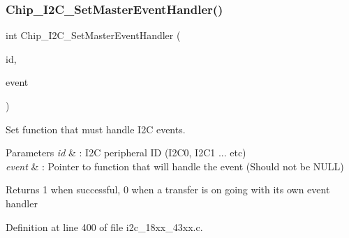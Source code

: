\subsubsection{\texorpdfstring{Chip\+\_\+\+I2\+C\+\_\+\+Set\+Master\+Event\+Handler()}{Chip\_I2C\_SetMasterEventHandler()}}
{\footnotesize\ttfamily int Chip\+\_\+\+I2\+C\+\_\+\+Set\+Master\+Event\+Handler (\begin{DoxyParamCaption}\item[{\hyperlink{group___i2_c__18_x_x__43_x_x_ga957556a4d900506cd4cba8427afd81e6}{I2\+C\+\_\+\+I\+D\+\_\+T}}]{id,  }\item[{\hyperlink{group___i2_c__18_x_x__43_x_x_gaef152f4dc1487d90573810007489082e}{I2\+C\+\_\+\+E\+V\+E\+N\+T\+H\+A\+N\+D\+L\+E\+R\+\_\+T}}]{event }\end{DoxyParamCaption})}



Set function that must handle I2C events. 


\begin{DoxyParams}{Parameters}
{\em id} & \+: I2C peripheral ID (I2\+C0, I2\+C1 ... etc) \\
\hline
{\em event} & \+: Pointer to function that will handle the event (Should not be N\+U\+LL) \\
\hline
\end{DoxyParams}
\begin{DoxyReturn}{Returns}
1 when successful, 0 when a transfer is on going with its own event handler 
\end{DoxyReturn}


Definition at line 400 of file i2c\+\_\+18xx\+\_\+43xx.\+c.

\mbox{\label{group___i2_c__18_x_x__43_x_x_gaf6ea40668dde26e406f76ff3ddeda527}} 
